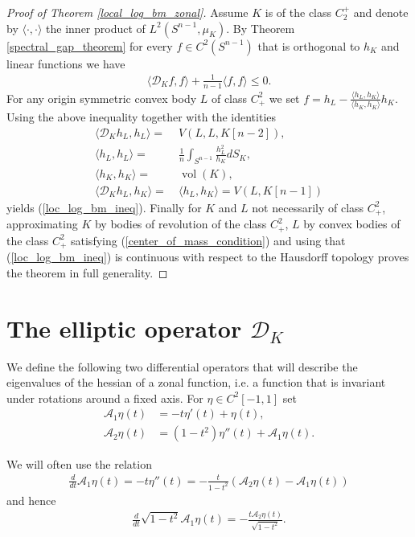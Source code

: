 \documentclass[12pt,twoside]{amsart}
\numberwithin{satz}{section}
\theoremstyle{definition}
\numberwithin{equation}{section}
\newcommand\vol{\operatorname{vol}}
\begin{document}
	\begin{proof}[Proof of Theorem \ref{local_log_bm_zonal}]
		
		Assume $K$ is of the class $C_2^+$ and denote by $\langle\cdot,\cdot\rangle$ the inner product of $L^2(S^{n-1},\mu_K)$. By Theorem \ref{spectral_gap_theorem} for every $f\in C^2(S^{n-1})$ that is orthogonal to $h_K$ and linear functions we have
		\begin{align}\label{operator_ineq}
			\langle \mathcal{D}_Kf,f\rangle+\frac{1}{n-1}\langle f,f\rangle \leq 0.
		\end{align}
		For any origin symmetric convex body $L$ of class $C_+^2$ we set $f=h_L-\frac{\langle h_L,h_K\rangle}{\langle h_K,h_K\rangle}h_K$. Using the above inequality together with the identities
		\begin{align*}
			\langle \mathcal{D}_Kh_L,h_L\rangle =& \ V(L,L,K[n-2]), \\
			\langle h_L,h_L\rangle =& \ \frac{1}{n}\int_{S^{n-1}}\frac{h_L^2}{h_K}dS_K, \\
			\langle h_K,h_K\rangle=& \ \vol(K), \\
			\langle \mathcal{D}_Kh_L,h_K\rangle =& \ \langle h_L,h_K\rangle = V(L,K[n-1])
		\end{align*}
		yields (\ref{loc_log_bm_ineq}). Finally for $K$ and $L$ not necessarily of class $C_+^2$, approximating $K$ by bodies of revolution of the class $C_+^2$, $L$ by convex bodies of the class $C_+^2$ satisfying (\ref{center_of_mass_condition}) and using that (\ref{loc_log_bm_ineq}) is continuous with respect to the Hausdorff topology proves the theorem in full generality.		
	\end{proof} 
	
	\section{The elliptic operator $\mathcal{D}_K$}
	
	We define the following two differential operators that will describe the eigenvalues of the hessian of a zonal function, i.e. a function that is invariant under rotations around a fixed axis. For $\eta\in C^2[-1,1]$ set
	\begin{align*}
		\mathcal{A}_1\eta(t) & =-t\eta'(t)+\eta(t),\\
		\mathcal{A}_2\eta(t) &=(1-t^2)\eta''(t)+\mathcal{A}_1\eta(t).
	\end{align*}
	
	We will often use the relation
	\begin{align*}
		\frac{d}{dt} \mathcal A_1\eta(t)=-t\eta''(t)=-\frac{t}{1-t^2} (\mathcal A_2 \eta(t)-\mathcal A_1 \eta(t))
	\end{align*}
	and hence
	\begin{align*}
		\frac{d}{dt}\sqrt{1-t^2}\mathcal{A}_1\eta(t)=-\frac{t\mathcal{A}_2\eta(t)}{\sqrt{1-t^2}}.
	\end{align*}
	
\end{document}
